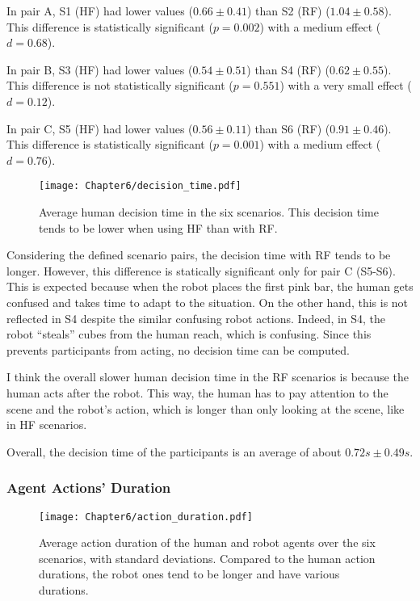 In pair A, S1 (HF) had lower values ($0.66 \pm 0.41$) than S2 (RF) ($1.04 \pm 0.58$). This difference is statistically significant ($p=0.002$) with a medium effect ($d=0.68$).

In pair B, S3 (HF) had lower values ($0.54 \pm 0.51$) than S4 (RF) ($0.62 \pm 0.55$). This difference is not statistically significant ($p=0.551$) with a very small effect ($d=0.12$).

In pair C, S5 (HF) had lower values ($0.56 \pm 0.11$) than S6 (RF) ($0.91 \pm 0.46$). This difference is statistically significant ($p=0.001$) with a medium effect ($d=0.76$).

\begin{figure}
    \center
    \texttt{[image: Chapter6/decision\_time.pdf]}
    \caption{Average human decision time in the six scenarios. This decision time tends to be lower when using HF than with RF.}
    \label{fig:decision_time}
\end{figure}

Considering the defined scenario pairs, the decision time with RF tends to be longer. However, this difference is statically significant only for pair C (S5-S6). This is expected because when the robot places the first pink bar, the human gets confused and takes time to adapt to the situation. On the other hand, this is not reflected in S4 despite the similar confusing robot actions. Indeed, in S4, the robot ``steals'' cubes from the human reach, which is confusing. Since this prevents participants from acting, no decision time can be computed. 

I think the overall slower human decision time in the RF scenarios is because the human acts after the robot. This way, the human has to pay attention to the scene and the robot's action, which is longer than only looking at the scene, like in HF scenarios.   

Overall, the decision time of the participants is an average of about $0.72s \pm 0.49s$.


\subsubsection*{Agent Actions' Duration}

\begin{figure}[h]
    \center
    \texttt{[image: Chapter6/action\_duration.pdf]}
    \caption{Average action duration of the human and robot agents over the six scenarios, with standard deviations. Compared to the human action durations, the robot ones tend to be longer and have various durations.}
    \label{fig:action_durations}
\end{figure}

